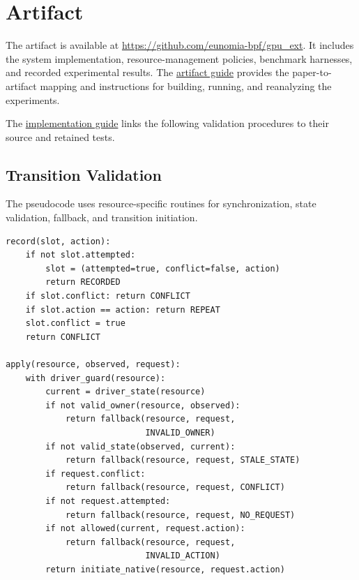 \section{Artifact}
\label{app:artifact}

The \sys{} artifact is available at \url{https://github.com/eunomia-bpf/gpu_ext}.
It includes the system implementation, resource-management policies, benchmark harnesses, and recorded experimental results.
The \href{https://github.com/eunomia-bpf/gpu_ext/blob/master/ARTIFACT.md}{artifact guide} provides the paper-to-artifact mapping and instructions for building, running, and reanalyzing the experiments.

The \href{https://github.com/eunomia-bpf/gpu_ext/blob/master/docs/revision-safety-design.md}{implementation guide} links the following validation procedures to their source and retained tests.

\subsection{Transition Validation}
The pseudocode uses resource-specific routines for synchronization, state validation, fallback, and transition initiation.

\begin{lstlisting}[language={},numbers=none,xleftmargin=0pt,columns=fullflexible,keepspaces=true]
record(slot, action):
    if not slot.attempted:
        slot = (attempted=true, conflict=false, action)
        return RECORDED
    if slot.conflict: return CONFLICT
    if slot.action == action: return REPEAT
    slot.conflict = true
    return CONFLICT

apply(resource, observed, request):
    with driver_guard(resource):
        current = driver_state(resource)
        if not valid_owner(resource, observed):
            return fallback(resource, request,
                            INVALID_OWNER)
        if not valid_state(observed, current):
            return fallback(resource, request, STALE_STATE)
        if request.conflict:
            return fallback(resource, request, CONFLICT)
        if not request.attempted:
            return fallback(resource, request, NO_REQUEST)
        if not allowed(current, request.action):
            return fallback(resource, request,
                            INVALID_ACTION)
        return initiate_native(resource, request.action)
\end{lstlisting}

